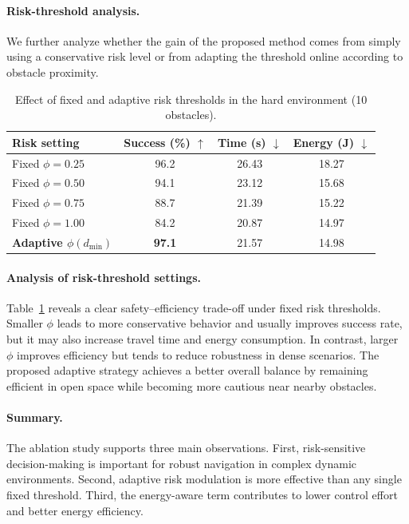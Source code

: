 \paragraph{Risk-threshold analysis.}
We further analyze whether the gain of the proposed method comes from simply using a conservative risk level or from adapting the threshold online according to obstacle proximity.

\begin{table}[t]
\centering
\caption{Effect of fixed and adaptive risk thresholds in the hard environment (10 obstacles).}
\label{tab:ablation_phi}
\setlength{\tabcolsep}{6pt}
\renewcommand{\arraystretch}{1.1}
\begin{tabular*}{\linewidth}{@{\extracolsep{\fill}}lccc@{}}
\hline
Risk setting & Success (\%) $\uparrow$ & Time (s) $\downarrow$ & Energy (J) $\downarrow$ \\
\hline
Fixed $\phi=0.25$ & 96.2 & 26.43 & 18.27 \\
Fixed $\phi=0.50$ & 94.1 & 23.12 & 15.68 \\
Fixed $\phi=0.75$ & 88.7 & 21.39 & 15.22 \\
Fixed $\phi=1.00$ & 84.2 & 20.87 & 14.97 \\
\textbf{Adaptive $\phi(d_{\min})$} & \textbf{97.1} & 21.57 & 14.98 \\
\hline
\end{tabular*}
\end{table}

\paragraph{Analysis of risk-threshold settings.}
Table~\ref{tab:ablation_phi} reveals a clear safety--efficiency trade-off under fixed risk thresholds.
Smaller $\phi$ leads to more conservative behavior and usually improves success rate, but it may also increase travel time and energy consumption.
In contrast, larger $\phi$ improves efficiency but tends to reduce robustness in dense scenarios.
The proposed adaptive strategy achieves a better overall balance by remaining efficient in open space while becoming more cautious near nearby obstacles.

\paragraph{Summary.}
The ablation study supports three main observations.
First, risk-sensitive decision-making is important for robust navigation in complex dynamic environments.
Second, adaptive risk modulation is more effective than any single fixed threshold.
Third, the energy-aware term contributes to lower control effort and better energy efficiency.